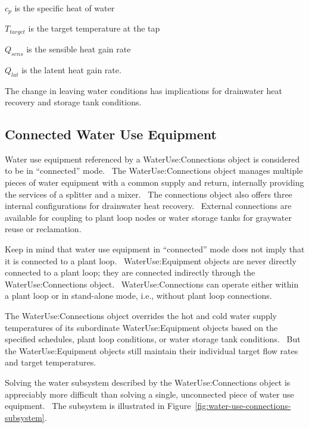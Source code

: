 \({c_p}\) is the specific heat of water

\({T_{target}}\) is the target temperature at the tap

\({Q_{sens}}\) is the sensible heat gain rate

\({Q_{lat}}\) is the latent heat gain rate.

The change in leaving water conditions has implications for drainwater heat recovery and storage tank conditions.

\subsection{Connected Water Use Equipment}\label{connected-water-use-equipment}

Water use equipment referenced by a WaterUse:Connections object is considered to be in ``connected'' mode.~ The WaterUse:Connections object manages multiple pieces of water equipment with a common supply and return, internally providing the services of a splitter and a mixer.~ The connections object also offers three internal configurations for drainwater heat recovery.~ External connections are available for coupling to plant loop nodes or water storage tanks for graywater reuse or reclamation.

Keep in mind that water use equipment in ``connected'' mode does not imply that it is connected to a plant loop.~ WaterUse:Equipment objects are never directly connected to a plant loop; they are connected indirectly through the WaterUse:Connections object.~ WaterUse:Connections can operate either within a plant loop or in stand-alone mode, i.e., without plant loop connections.

The WaterUse:Connections object overrides the hot and cold water supply temperatures of its subordinate WaterUse:Equipment objects based on the specified schedules, plant loop conditions, or water storage tank conditions.~ But the WaterUse:Equipment objects still maintain their individual target flow rates and target temperatures.

Solving the water subsystem described by the WaterUse:Connections object is appreciably more difficult than solving a single, unconnected piece of water use equipment.~ The subsystem is illustrated in Figure~\ref{fig:water-use-connections-subsystem}.

